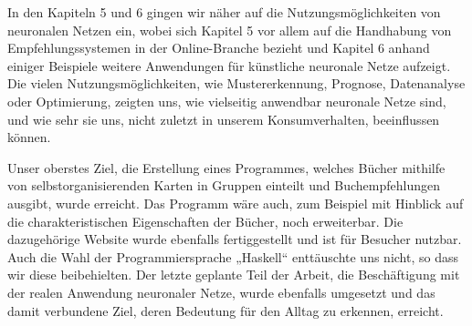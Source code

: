 \documentclass[twoside,a4paper]{article}
\begin{document}
 In den Kapiteln 5 und 6 gingen wir näher auf die Nutzungsmöglichkeiten von neuronalen Netzen ein, wobei sich Kapitel 5 vor allem auf die Handhabung von Empfehlungssystemen in der Online-Branche bezieht und Kapitel 6 anhand einiger Beispiele weitere Anwendungen für künstliche neuronale Netze aufzeigt. Die vielen Nutzungsmöglichkeiten, wie Mustererkennung, Prognose, Datenanalyse oder Optimierung, zeigten uns, wie vielseitig anwendbar neuronale Netze sind, und wie sehr sie uns, nicht zuletzt in unserem Konsumverhalten, beeinflussen können.

Unser oberstes Ziel, die Erstellung eines Programmes, welches Bücher mithilfe von selbstorganisierenden Karten in Gruppen einteilt und Buchempfehlungen ausgibt, wurde erreicht. Das Programm wäre auch, zum Beispiel mit Hinblick auf die charakteristischen Eigenschaften der Bücher, noch erweiterbar. Die dazugehörige Website wurde ebenfalls fertiggestellt und ist für Besucher nutzbar. Auch die Wahl der Programmiersprache „Haskell“ enttäuschte uns nicht, so dass wir diese beibehielten. Der letzte geplante Teil der Arbeit, die Beschäftigung mit der realen Anwendung neuronaler Netze, wurde ebenfalls umgesetzt und das damit verbundene Ziel, deren Bedeutung für den Alltag zu erkennen, erreicht.
\end{document}
